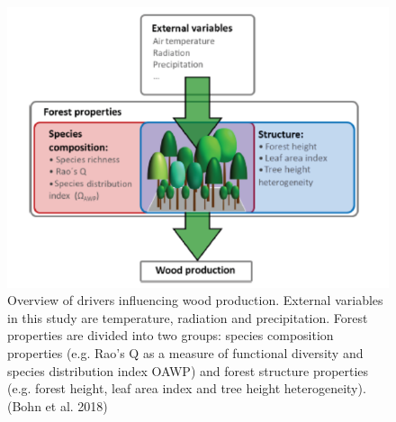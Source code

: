 \documentclass[12pt,oneside]{book}
\begin{document}
\begin{figure}

{\centering \includegraphics[width=0.8\linewidth]{figures/chap6/f635_bohn1} 

}

\caption{Overview of drivers influencing wood production. External variables in this study are temperature, radiation and precipitation. Forest properties are divided into two groups: species composition properties (e.g. Rao’s Q as a measure of functional diversity and species distribution index OAWP) and forest structure properties (e.g. forest height, leaf area index and tree height heterogeneity). (Bohn et al. 2018)}\label{fig:f635}
\end{figure}
\end{document}

